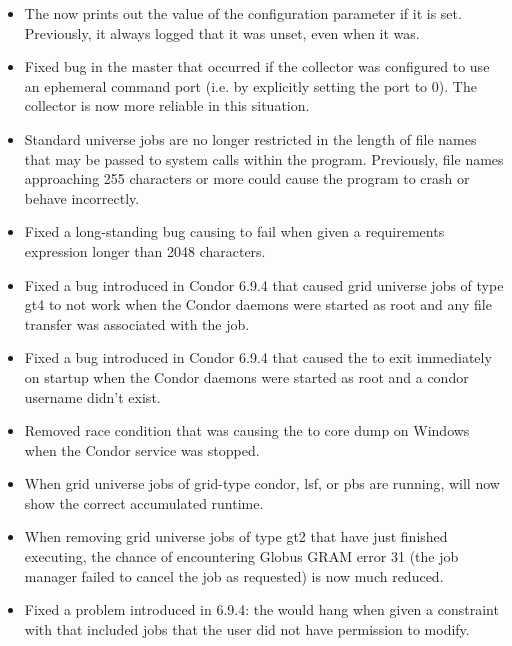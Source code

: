 \begin{itemize}
\item The  now prints out the value of the configuration
	parameter  if it is set.  Previously,
	it always logged that it was unset, even when it was.

\item Fixed bug in the master that occurred if the collector
	was configured to use an ephemeral command port 
	(i.e. by explicitly setting the port to 0).	  The collector
	is now more reliable in this situation.

\item Standard universe jobs are no longer restricted in the length of
file names that may be passed to system calls within the program.
Previously, file names approaching 255 characters or more could
cause the program to crash or behave incorrectly.

\item Fixed a long-standing bug causing  to fail when
given a requirements expression longer than 2048 characters.

\item Fixed a bug introduced in Condor 6.9.4 that caused grid universe
jobs of type gt4 to not work when the Condor daemons were started as
root and any file transfer was associated with the job.

\item Fixed a bug introduced in Condor 6.9.4 that caused the
 to exit immediately on startup when the Condor
daemons were started as root and a condor username didn't exist.

\item Removed race condition that was causing the  to core
  dump on Windows when the Condor service was stopped.

\item When grid universe jobs of grid-type condor, lsf, or pbs are running,
 will now show the correct accumulated runtime.

\item When removing grid universe jobs of type gt2 that have just finished
executing, the chance of encountering Globus GRAM error 31 (the job manager
failed to cancel the job as requested) is now much reduced.

\item Fixed a problem introduced in 6.9.4: the  would hang
when given a constraint with  that included jobs that the user
did not have permission to modify.


\end{itemize}

